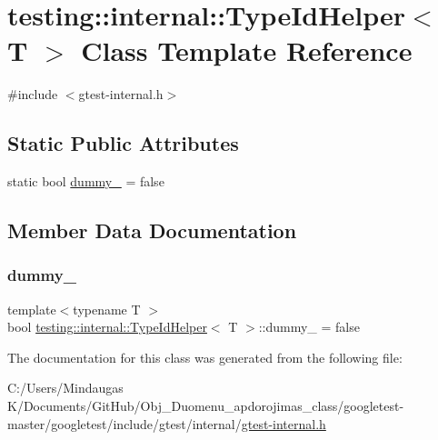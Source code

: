 \hypertarget{classtesting_1_1internal_1_1_type_id_helper}{}\section{testing\+::internal\+::Type\+Id\+Helper$<$ T $>$ Class Template Reference}
\label{classtesting_1_1internal_1_1_type_id_helper}


{\ttfamily \#include $<$gtest-\/internal.\+h$>$}

\subsection*{Static Public Attributes}
\begin{DoxyCompactItemize}
\item 
static bool \mbox{\hyperlink{classtesting_1_1internal_1_1_type_id_helper_a372268b1520d965d0bdf01ebad3d270e}{dummy\+\_\+}} = false
\end{DoxyCompactItemize}


\subsection{Member Data Documentation}
\mbox{\label{classtesting_1_1internal_1_1_type_id_helper_a372268b1520d965d0bdf01ebad3d270e}} 
\subsubsection{\texorpdfstring{dummy\_}{dummy\_}}
{\footnotesize\ttfamily template$<$typename T $>$ \\
bool \mbox{\hyperlink{classtesting_1_1internal_1_1_type_id_helper}{testing\+::internal\+::\+Type\+Id\+Helper}}$<$ T $>$\+::dummy\+\_\+ = false\hspace{0.3cm}{\ttfamily [static]}}



The documentation for this class was generated from the following file\+:\begin{DoxyCompactItemize}
\item 
C\+:/\+Users/\+Mindaugas K/\+Documents/\+Git\+Hub/\+Obj\+\_\+\+Duomenu\+\_\+apdorojimas\+\_\+class/googletest-\/master/googletest/include/gtest/internal/\mbox{\hyperlink{googletest-master_2googletest_2include_2gtest_2internal_2gtest-internal_8h}{gtest-\/internal.\+h}}\end{DoxyCompactItemize}
